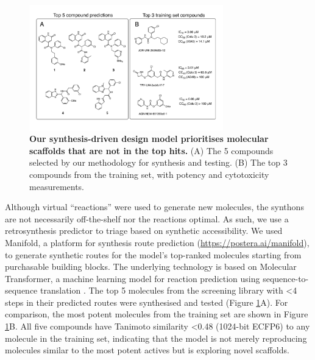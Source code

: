 \begin{figure}[!bh]
 \centering
 \includegraphics[width=0.75\textwidth]{Chapters/Ranking/Figs/fig2.pdf}
 \caption{\textbf{Our synthesis-driven design model prioritises molecular scaffolds that are not in the top hits.} (A) The 5 compounds selected by our methodology for synthesis and testing. (B) The top 3 compounds from the training set, with potency and cytotoxicity measurements.}
 \label{fig:compounds}
\end{figure}

Although virtual ``reactions'' were used to generate new molecules, the synthons are not necessarily off-the-shelf nor the reactions optimal. As such, we use a retrosynthesis predictor to triage based on synthetic accessibility. We used Manifold, a platform for synthesis route prediction (\url{https://postera.ai/manifold}), to generate synthetic routes for the model's top-ranked molecules starting from purchasable building blocks. The underlying technology is based on Molecular Transformer, a machine learning model for reaction prediction using sequence-to-sequence translation \citep{yang2019molecular,schwaller2019molecular}. The top 5 molecules from the screening library with <4 steps in their predicted routes were synthesised and tested (Figure \ref{fig:compounds}A). For comparison, the most potent molecules from the training set are shown in Figure \ref{fig:compounds}B. All five compounds have Tanimoto similarity <0.48 (1024-bit ECFP6) to any molecule in the training set, indicating that the model is not merely reproducing molecules similar to the most potent actives but is exploring novel scaffolds.

